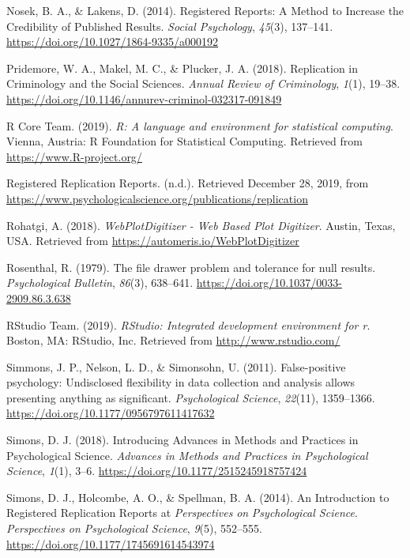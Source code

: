 \documentclass[british,,man,floatsintext]{apa6}
\begin{document}
\leavevmode\hypertarget{ref-Nosek2014}{}%
Nosek, B. A., \& Lakens, D. (2014). Registered Reports: A Method to Increase the Credibility of Published Results. \emph{Social Psychology}, \emph{45}(3), 137--141. \url{https://doi.org/10.1027/1864-9335/a000192}

\leavevmode\hypertarget{ref-Pridemore2018}{}%
Pridemore, W. A., Makel, M. C., \& Plucker, J. A. (2018). Replication in Criminology and the Social Sciences. \emph{Annual Review of Criminology}, \emph{1}(1), 19--38. \url{https://doi.org/10.1146/annurev-criminol-032317-091849}

\leavevmode\hypertarget{ref-R-base}{}%
R Core Team. (2019). \emph{R: A language and environment for statistical computing}. Vienna, Austria: R Foundation for Statistical Computing. Retrieved from \url{https://www.R-project.org/}

\leavevmode\hypertarget{ref-RRRwebsite}{}%
Registered Replication Reports. (n.d.). Retrieved December 28, 2019, from \url{https://www.psychologicalscience.org/publications/replication}

\leavevmode\hypertarget{ref-Rohatgi2018}{}%
Rohatgi, A. (2018). \emph{WebPlotDigitizer - Web Based Plot Digitizer}. Austin, Texas, USA. Retrieved from \url{https://automeris.io/WebPlotDigitizer}

\leavevmode\hypertarget{ref-Rosenthal1979}{}%
Rosenthal, R. (1979). The file drawer problem and tolerance for null results. \emph{Psychological Bulletin}, \emph{86}(3), 638--641. \url{https://doi.org/10.1037/0033-2909.86.3.638}

\leavevmode\hypertarget{ref-RStudioTeam2019}{}%
RStudio Team. (2019). \emph{RStudio: Integrated development environment for r}. Boston, MA: RStudio, Inc. Retrieved from \url{http://www.rstudio.com/}

\leavevmode\hypertarget{ref-Simmons2011}{}%
Simmons, J. P., Nelson, L. D., \& Simonsohn, U. (2011). False-positive psychology: Undisclosed flexibility in data collection and analysis allows presenting anything as significant. \emph{Psychological Science}, \emph{22}(11), 1359--1366. \url{https://doi.org/10.1177/0956797611417632}

\leavevmode\hypertarget{ref-Simons2018}{}%
Simons, D. J. (2018). Introducing Advances in Methods and Practices in Psychological Science. \emph{Advances in Methods and Practices in Psychological Science}, \emph{1}(1), 3--6. \url{https://doi.org/10.1177/2515245918757424}

\leavevmode\hypertarget{ref-Simons2014}{}%
Simons, D. J., Holcombe, A. O., \& Spellman, B. A. (2014). An Introduction to Registered Replication Reports at \emph{Perspectives} \emph{on} \emph{Psychological Science}. \emph{Perspectives on Psychological Science}, \emph{9}(5), 552--555. \url{https://doi.org/10.1177/1745691614543974}
\end{document}
